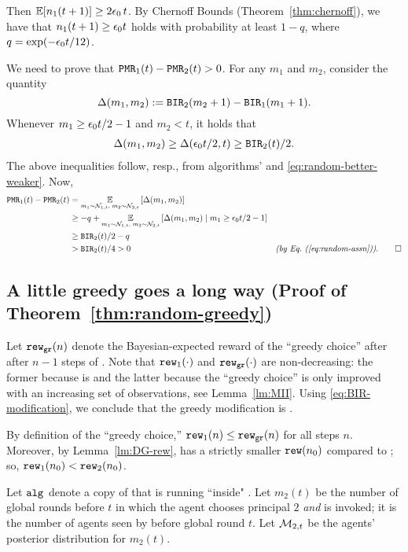 Then
    $\E[n_1(t+1)] \geq 2\eps_0\,t $.
By Chernoff Bounds (Theorem~\ref{thm:chernoff}), we have that
    $n_1(t+1)\geq \epsilon_0 t$
holds with probability at least $1-q$,
where $q = \exp(-\epsilon_0 t/12)$.

We need to prove that
    $\mathtt{PMR}_1(t) - \mathtt{PMR}_2(t)>0$.
For any $m_1$ and $m_2$, consider the quantity
\[ \Delta(m_1,m_2) := \mathtt{BIR}_2(m_2+1) - \mathtt{BIR}_1(m_1+1).\]
Whenever $m_1 \geq \epsilon_0 t/2 -1$ and $m_2<t$, it holds that
\begin{align*}
\Delta(m_1,m_2) \geq \Delta(\epsilon_0 t / 2, t)
    \geq \mathtt{BIR}_2(t)/2.
\end{align*}
The above inequalities follow, resp., from algorithms' \bmonotonicity and \eqref{eq:random-better-weaker}. Now,
\begin{align*}
\PMR_1(t) - \PMR_2(t)
    &= \Ex{m_1\sim \posteriorN{1}{t},\;m_2\sim \posteriorN{2}{t}}{\Delta(m_1,m_2)} \\
    &\geq -q
        + \Ex{m_1\sim \posteriorN{1}{t},\;m_2\sim \posteriorN{2}{t}}
            {\Delta(m_1,m_2)\mid m_1 \geq \eps_0 t/2-1} \\
    &\geq \BIR_2(t)/2-q \\
    &> \BIR_2(t)/4 > 0
    &\EqComment{by \refeq{eq:random-assn}}. \qedhere
\end{align*}

\subsection{A little greedy goes a long way
(Proof of Theorem~\ref{thm:random-greedy})}
\label{sec:proofs-HMR-greedy}


  Let $\mathtt{rew}_{\texttt{gr}}(n)$ denote the Bayesian-expected reward of the ``greedy
  choice'' after after $n-1$ steps of \alg[1]. Note that
  $\mathtt{rew}_1(\cdot)$ and $\mathtt{rew}_{\texttt{gr}}(\cdot)$ are non-decreasing: the former
  because \alg[1] is \bmonotone and the latter because the ``greedy
  choice'' is only improved with an increasing set of
  observations, see Lemma~\ref{lm:MII}.
Using \eqref{eq:BIR-modification}, we conclude that
the greedy modification \alg[2] is \bmonotone.

  By definition of the ``greedy choice,'' $\mathtt{rew}_1(n)\leq \mathtt{rew}_{\texttt{gr}}(n)$
  for all steps $n$. Moreover, by Lemma~\ref{lm:DG-rew},
  \alg[1] has a strictly smaller $\mathtt{rew}(n_0)$ compared to \DynGreedy;
  so, $\mathtt{rew}_1(n_0)<\mathtt{rew}_2(n_0)$.

Let $\mathtt{alg}_{}$ denote a copy of \alg[1] that is running ``inside" \alg[2]. Let $m_2(t)$ be the number of global rounds before $t$ in which the agent chooses principal $2$ \emph{and} \alg is invoked; \ie it is the number of agents seen by \alg before global round $t$. Let $\mathcal{M}_{2,t}$ be the agents' posterior distribution for $m_2(t)$.


